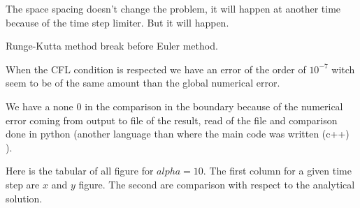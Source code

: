 The space spacing doesn't change the problem, it will happen at another time because of the time step limiter.
But it will happen.

Runge-Kutta method break before Euler method.

When the CFL condition is respected we have an error of the order of $10^{-7}$ witch seem to be of the same amount than the global numerical error.

We have a none 0 in the comparison in the boundary because of the numerical error coming from output to file of the result,
read of the file and comparison done in python (another language than where the main code was written (c++) ).

Here is the tabular of all figure for $alpha=10$. The first column for a given time step are $x$ and $y$ figure.
The second are comparison with respect to the analytical solution.

